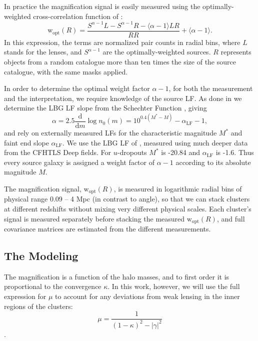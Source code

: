 In practice the magnification signal is easily measured using the optimally-weighted cross-correlation function of \citet{Menard03}:
\begin{equation}
\mathrm{w}_{\mathrm{opt}}(R)=\frac{S^{\alpha-1} L - S^{\alpha-1} R - \langle \alpha-1 \rangle LR}{RR} + \langle \alpha-1 \rangle.
\end{equation}
In this expression, the terms are normalized pair counts in radial bins, where $L$ stands for the lenses, and $S^{\alpha-1}$ are the optimally-weighted sources. $R$ represents objects from a random catalogue more than ten times the size of the source catalogue, with the same masks applied.

In order to determine the optimal weight factor $\alpha-1$, for both the measurement and the interpretation, we require knowledge of the source \ac{LF}. As done in \citet{Ford12} we determine the \ac{LBG} \ac{LF} slope from the Schechter Function \citep{Schechter76}, giving
\begin{equation}
\alpha = 2.5 \frac{\mathrm{d}}{\mathrm{d}m}\log n_0(m) = 10^{0.4(M^\ast-M)}-\alpha_{\mathrm{LF}}-1,
\end{equation}
and rely on externally measured \ac{LF}s for the characteristic magnitude $M^\ast$ and faint end slope $\alpha_{\mathrm{LF}}$. We use the \ac{LBG} \ac{LF} of \citet{vanderBurg10}, measured using much deeper data from the \ac{CFHTLS} Deep fields. For $u$-dropouts $M^\ast$ is -20.84 and $\alpha_{\mathrm{LF}}$ is -1.6. Thus every source galaxy is assigned a weight factor of $\alpha-1$ according to its absolute magnitude $M$.

The magnification signal, $\mathrm{w}_{\mathrm{opt}}(R)$, is measured in logarithmic radial bins of physical range 0.09 -- 4 Mpc (in contrast to angle), so that we can stack clusters at different redshifts without mixing very different physical scales. Each cluster's signal is measured separately before stacking the measured $\mathrm{w}_{\mathrm{opt}}(R)$, and full covariance matrices are estimated from the different measurements. 


\subsection{The Modeling}
\label{model}

The magnification is a function of the halo masses, and to first order it is proportional to the convergence $\kappa$. In this work, however, we will use the full expression for $\mu$ to account for any deviations from weak lensing in the inner regions of the clusters:
\begin{equation}
\mu = \frac{1}{(1-\kappa)^2 - \left|\gamma\right|^2}
\end{equation}
\citep{BS01}.


